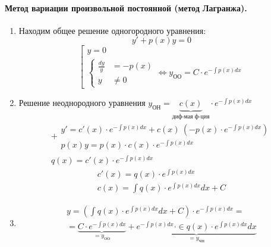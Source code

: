 \documentclass[11pt,a4paper,oneside]{report}
\theoremstyle{definition}
\theoremstyle{plain}
\theoremstyle{remark}
\begin{document}
\paragraph*{Метод вариации произвольной постоянной (метод Лагранжа).}
\begin{enumerate}
    \item Находим общее решение одногородного уравнения:
          \begin{equation*}
              y' + p(x)y = 0
          \end{equation*}
          \begin{equation*}
              \left[\begin{array}{l}
                  y = 0 \\
                  \left\{\begin{array}{rl}
                             \frac{dy}{y} & = -p(x) \\
                             y            & \ne 0
                         \end{array}\right.\iff y_\text{ОО} = C \cdot e^{-\int p(x)dx}
              \end{array}\right.
          \end{equation*}
    \item Решение неоднородного уравнения $y_\text{ОН} = \underbrace{c(x)}_{\text{диф-мая ф-ция}}\cdot e^{-\int p(x)dx}$
          \begin{equation*}
              \begin{array}{l}
                  + \begin{array}{l}
                        y' = c'(x)\cdot e^{-\int p(x)dx} + c(x) \ (-p(x)\cdot e^{-\int p(x)dx}) \\
                        p(x)y = p(x)\cdot c(x) \cdot e^{-\int p(x)dx}
                    \end{array} \\ \hline
                  q(x) = c'(x)\cdot e^{-\int p(x)dx}
              \end{array}
          \end{equation*}
          \begin{align*}
              c'(x) = q(x)\cdot e^{\int p(x)dx} \\
              c(x) = \int q(x)\cdot e^{\int p(x)dx}dx + C
          \end{align*}
    \item \begin{multline*}
              y = \left(\int q(x)\cdot e^{\int p(x)dx}dx + C\right)\cdot e^{-\int p(x)dx} = \\
              = \underbrace{C\cdot e^{-\int p(x)dx}}_{=y_\text{ОО}} + \underbrace{e^{-\int p(x)dx}\cdot \in q(x)\cdot e^{\int p(x)dx}dx}_{=y_\text{ЧН}}
          \end{multline*}
\end{enumerate}
\end{document}
